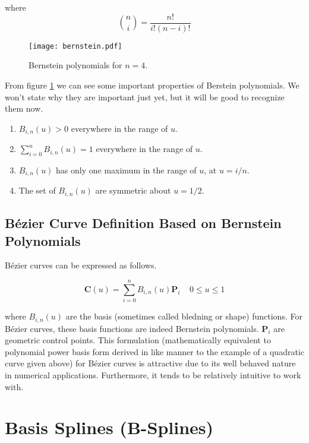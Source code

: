 where \begin{equation} {n\choose i} = \frac{n!}{i!(n-i)!} \end{equation} 

\begin{figure}[htbp]
	\centering
	\texttt{[image: bernstein.pdf]}
	\caption{Bernstein polynomials for $n=4$.}
	\label{fig:bernstein}
\end{figure}

From figure \ref{fig:bernstein} we can see some important properties of Berstein polynomials. We won't state why they are important just yet, but it will be good to recognize them now.

\begin{enumerate}
	\item $B_{i,n}(u) > 0$ everywhere in the range of $u$.
	\item $\sum_{i=0}^n B_{i,n}(u) = 1$ everywhere in the range of $u$.
	\item $B_{i,n}(u)$ has only one maximum in the range of $u$, at $u=i/n$.
	\item The set of  $B_{i,n}(u)$ are symmetric about $u=1/2$.
\end{enumerate}

\subsection{Bézier Curve Definition Based on Bernstein Polynomials}

Bézier curves can be expressed as follows.

\begin{equation} \textbf{C}(u) = \sum^n_{i=0}B_{i,n}(u) \textbf{P}_i~~~~~0\leq u \leq1 \end{equation}

where $B_{i,n}(u)$ are the basis (sometimes called bledning or shape) functions. For Bézier curves, these basis functions are indeed Bernstein polynomials. \(\textbf{P}_i\) are geometric control points.  This formulation (mathematically equivalent to polynomial power basis form derived in like manner to the example of a quadratic curve given above) for Bézier curves is attractive due to its well behaved nature in numerical applications. Furthermore, it tends to be relatively intuitive to work with.

\section{Basis Splines (B-Splines)}

